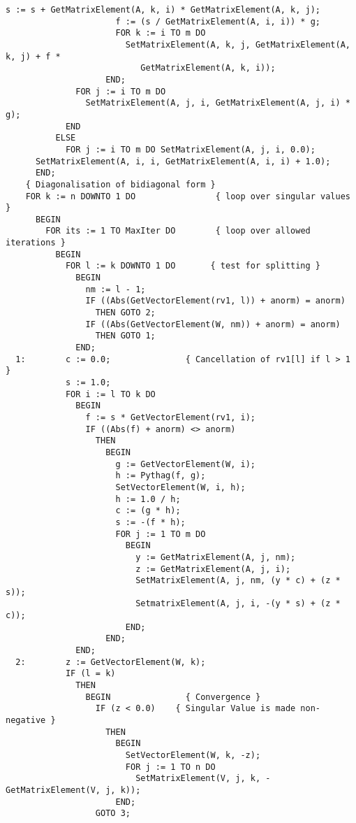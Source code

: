 \begin{lstlisting}[caption=Singular value decomposition]
                        s := s + GetMatrixElement(A, k, i) * GetMatrixElement(A, k, j);
                      f := (s / GetMatrixElement(A, i, i)) * g;
                      FOR k := i TO m DO
                        SetMatrixElement(A, k, j, GetMatrixElement(A, k, j) + f *
                           GetMatrixElement(A, k, i));
                    END;
              FOR j := i TO m DO
                SetMatrixElement(A, j, i, GetMatrixElement(A, j, i) * g);
            END
          ELSE
            FOR j := i TO m DO SetMatrixElement(A, j, i, 0.0);
      SetMatrixElement(A, i, i, GetMatrixElement(A, i, i) + 1.0);
      END;
    { Diagonalisation of bidiagonal form }
    FOR k := n DOWNTO 1 DO                { loop over singular values }
      BEGIN
        FOR its := 1 TO MaxIter DO        { loop over allowed iterations }
          BEGIN
            FOR l := k DOWNTO 1 DO       { test for splitting }
              BEGIN
                nm := l - 1;
                IF ((Abs(GetVectorElement(rv1, l)) + anorm) = anorm)
                  THEN GOTO 2;
                IF ((Abs(GetVectorElement(W, nm)) + anorm) = anorm)
                  THEN GOTO 1;
              END;
  1:        c := 0.0;               { Cancellation of rv1[l] if l > 1  }
            s := 1.0;
            FOR i := l TO k DO
              BEGIN
                f := s * GetVectorElement(rv1, i);
                IF ((Abs(f) + anorm) <> anorm)
                  THEN
                    BEGIN
                      g := GetVectorElement(W, i);
                      h := Pythag(f, g);
                      SetVectorElement(W, i, h);
                      h := 1.0 / h;
                      c := (g * h);
                      s := -(f * h);
                      FOR j := 1 TO m DO
                        BEGIN
                          y := GetMatrixElement(A, j, nm);
                          z := GetMatrixElement(A, j, i);
                          SetMatrixElement(A, j, nm, (y * c) + (z * s));
                          SetmatrixElement(A, j, i, -(y * s) + (z * c));
                        END;
                    END;
              END;
  2:        z := GetVectorElement(W, k);
            IF (l = k)
              THEN
                BEGIN               { Convergence }
                  IF (z < 0.0)    { Singular Value is made non-negative }
                    THEN
                      BEGIN
                        SetVectorElement(W, k, -z);
                        FOR j := 1 TO n DO
                          SetMatrixElement(V, j, k, -GetMatrixElement(V, j, k));
                      END;
                  GOTO 3;

\end{lstlisting}
